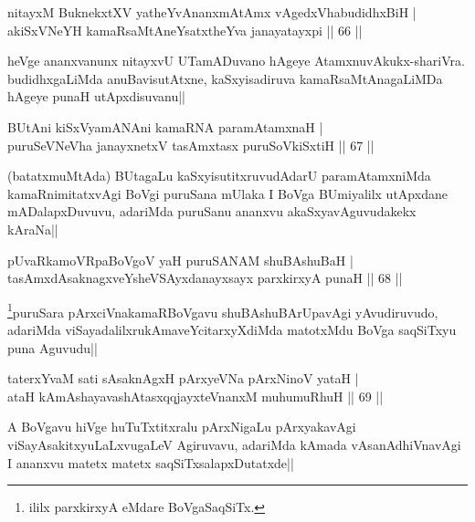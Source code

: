 
\begin{shl}
nitayxM BuknekxtXV yatheYvAnanxmAtAmx vAgedxVhabudidhxBiH |\\
akiSxVNeYH kamaRsaMtAneYsatxtheYva janayatayxpi \hfill || 66 ||
\end{shl}

\begin{artha}
heVge ananxvanunx nitayxvU UTamADuvano hAgeye AtamxnuvAkukx-shariVra. budidhxgaLiMda 
anuBavisutAtxne, kaSxyisadiruva kamaRsaMtAnagaLiMDa hAgeye punaH utApxdisuvanu||
\end{artha}


\begin{shl}
BUtAni kiSxVyamANAni kamaRNA paramAtamxnaH |\\
puruSeVNeVha janayxnetxV tasAmxtasx puruSoV\s kiSxtiH \hfill || 67 ||
\end{shl}

\begin{artha}
(batatxmuMtAda) BUtagaLu kaSxyisutitxruvudAdarU paramAtamxniMda kamaRnimitatxvAgi BoVgi puruSana mUlaka I BoVga BUmiyalilx utApxdane mADalapxDuvuvu, adariMda puruSanu ananxvu akaSxyavAguvudakekx kAraNa||
\end{artha}

\begin{shl}
pUvaRkamoVRpaBoVgoV yaH puruSANAM shuBAshuBaH |\\
tasAmxdAsaknagxveYsheVSAyxdanayxsayx parxkirxyA punaH \hfill || 68 ||
\end{shl}

\begin{artha}
\footnote{ililx parxkirxyA eMdare BoVgaSaqSiTx.}puruSara pArxciVnakamaRBoVgavu shuBAshuBArUpavAgi yAvudiruvudo, adariMda viSayadalilxrukAmaveYcitarxyXdiMda matotxMdu BoVga saqSiTxyu puna Aguvudu||
\end{artha}

\begin{shl}
taterxYvaM sati sAsaknAgxH pArxyeVNa pArxNinoV yataH |\\
ataH kAmAshayavashAtasxqqjayxteV\s nanxM muhumuRhuH \hfill || 69 ||
\end{shl}

\begin{artha}
A BoVgavu hiVge huTuTxtitxralu pArxNigaLu pArxyakavAgi viSayAsakitxyuLaLxvugaLeV Agiruvavu, adariMda kAmada vAsanAdhiVnavAgi I ananxvu matetx matetx saqSiTxsalapxDutatxde||
\end{artha}

